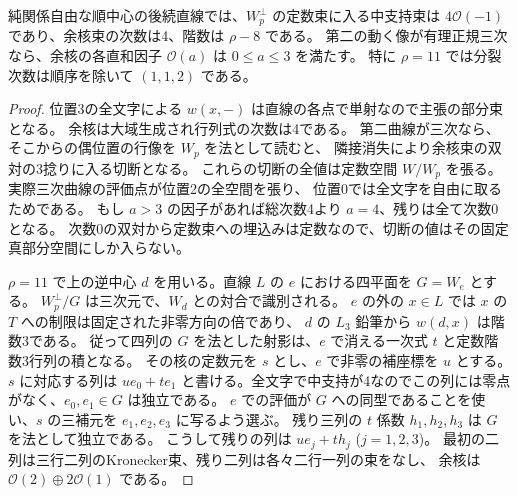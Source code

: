 \begin{proposition}\label{prop:branch-first-pencil-splitting}
純関係自由な順中心の後続直線では、$W_p^\perp$ の定数束に入る中支持束は
$4\mathcal O(-1)$ であり、余核束の次数は4、階数は $\rho-8$ である。
第二の動く像が有理正規三次なら、余核の各直和因子 $\mathcal O(a)$ は $0\le a\le3$ を満たす。
特に $\rho=11$ では分裂次数は順序を除いて $(1,1,2)$ である。
\end{proposition}
\begin{proof}
位置3の全文字による $w(x,-)$ は直線の各点で単射なので主張の部分束となる。
余核は大域生成され行列式の次数は4である。
第二曲線が三次なら、そこからの偶位置の行像を $W_p$ を法として読むと、
隣接消失により余核束の双対の3捻りに入る切断となる。
これらの切断の全値は定数空間 $W/W_p$ を張る。実際三次曲線の評価点が位置2の全空間を張り、
位置0では全文字を自由に取るためである。
もし $a>3$ の因子があれば総次数4より $a=4$、残りは全て次数0となる。
次数0の双対から定数束への埋込みは定数なので、切断の値はその固定真部分空間にしか入らない。

$\rho=11$ で上の逆中心 $d$ を用いる。直線 $L$ の $e$ における四平面を $G=W_e$ とする。
$W_p^\perp/G$ は三次元で、$W_d$ との対合で識別される。
$e$ の外の $x\in L$ では $x$ の $T$ への制限は固定された非零方向の倍であり、
$d$ の $L_3$ 鉛筆から $w(d,x)$ は階数3である。
従って四列の $G$ を法とした射影は、$e$ で消える一次式 $t$ と定数階数3行列の積となる。
その核の定数元を $s$ とし、$e$ で非零の補座標を $u$ とする。$s$ に対応する列は
$u e_0+t e_1$ と書ける。全文字で中支持が4なのでこの列には零点がなく、$e_0,e_1\in G$ は独立である。
$e$ での評価が $G$ への同型であることを使い、$s$ の三補元を $e_1,e_2,e_3$ に写るよう選ぶ。
残り三列の $t$ 係数 $h_1,h_2,h_3$ は $G$ を法として独立である。
こうして残りの列は $u e_j+t h_j$ ($j=1,2,3$)。
最初の二列は三行二列のKronecker束、残り二列は各々二行一列の束をなし、
余核は $\mathcal O(2)\oplus2\mathcal O(1)$ である。
\end{proof}
